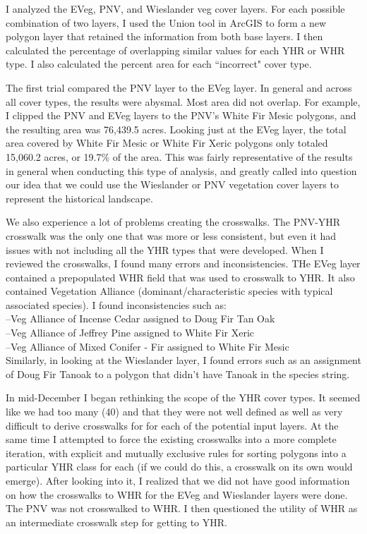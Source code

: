 I analyzed the EVeg, PNV, and Wieslander veg cover layers. For each possible combination of two layers, I used the Union tool in ArcGIS to form a new polygon layer that retained the information from both base layers. I then calculated the percentage of overlapping similar values for each YHR or WHR type. I also calculated the percent area for each ``incorrect" cover type. 

The first trial compared the PNV layer to the EVeg layer. In general and across all cover types, the results were abysmal. Most area did not overlap. For example, I clipped the PNV and EVeg layers to the PNV's White Fir Mesic polygons, and the resulting area was 76,439.5 acres. Looking just at the EVeg layer, the total area covered by White Fir Mesic or White Fir Xeric polygons only totaled 15,060.2 acres, or 19.7\% of the area. This was fairly representative of the results in general when conducting this type of analysis, and greatly called into question our idea that we could use the Wieslander or PNV vegetation cover layers to represent the historical landscape.

We also experience a lot of problems creating the crosswalks. The PNV-YHR crosswalk was the only one that was more or less consistent, but even it had issues with not including all the YHR types that were developed. When I reviewed the crosswalks, I found many errors and inconsistencies. THe EVeg layer contained a prepopulated WHR field that was used to crosswalk to YHR. It also contained Vegetation Alliance (dominant/characteristic species with typical associated species). I found inconsistencies such as:\\
--Veg Alliance of Incense Cedar assigned to Doug Fir Tan Oak\\
--Veg Alliance of Jeffrey Pine assigned to White Fir Xeric\\
--Veg Alliance of Mixed Conifer - Fir assigned to White Fir Mesic\\

Similarly, in looking at the Wieslander layer, I found errors such as an assignment of Doug Fir Tanoak to a polygon that didn't have Tanoak in the species string.

In mid-December I began rethinking the scope of the YHR cover types. It seemed like we had too many (40) and that they were not well defined as well as very difficult to derive crosswalks for for each of the potential input layers. At the same time I attempted to force the existing crosswalks into a more complete iteration, with explicit and mutually exclusive rules for sorting polygons into a particular YHR class for each (if we could do this, a crosswalk on its own would emerge). After looking into it, I realized that we did not have good information on how the crosswalks to WHR for the EVeg and Wieslander layers were done. The PNV was not crosswalked to WHR. I then questioned the utility of WHR as an intermediate crosswalk step for getting to YHR.

